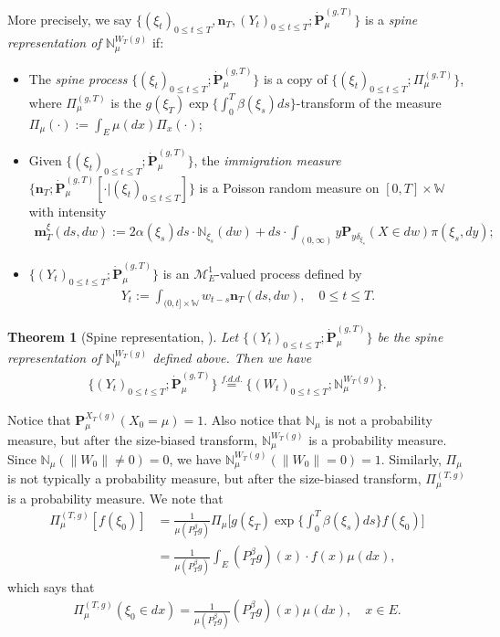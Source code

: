 \documentclass[12pt,a4paper]{amsart}
\newtheorem{thm}{Theorem}[section]
\theoremstyle{definition}
\numberwithin{equation}{section}
\begin{document}
More precisely,
we say $\{(\xi_t)_{0\leq t\leq T}, \mathbf n_T,  (Y_t)_{ 0\leq t\leq T}; \dot {\mathbf P}^{(g,T)}_\mu\}$ is a \emph{spine representation of $\mathbb N^{W_T(g)}_\mu$}  if:
\begin{itemize}
\item
	The \emph{spine process} $\{(\xi_t)_{0\leq t\leq T}; \dot{\mathbf P}^{(g,T)}_\mu\}$ is a copy of $\{(\xi_t)_{0\leq t\leq T}; \Pi^{(g,T)}_{\mu}\}$, where $\Pi^{(g,T)}_{\mu}$ is the $g(\xi_T) \exp\{\int_0^T \beta(\xi_s)ds\}$-transform of the measure $\Pi_{\mu}(\cdot):=\int_{E}\mu(dx)\Pi_x(\cdot) $;
\item
	Given $\{(\xi_t)_{0\leq t\leq T}; \dot{\mathbf P}^{(g,T)}_\mu\}$, the \emph{immigration measure} $\{\mathbf n_T; \dot{\mathbf P}^{(g,T)}_\mu[\cdot |(\xi_t)_{0\leq t\leq T}]\}$ is a Poisson random measure on $[0,T] \times \mathbb W$ with intensity
  \begin{align}
    \mathbf m^\xi_T(ds,dw)
    := 2 \alpha(\xi_s) ds \cdot \mathbb N_{\xi_s}(dw) + ds \cdot \int_{(0,\infty)} y \mathbf P_{y\delta_{\xi_s}}(X\in dw) \pi(\xi_s,dy);
  \end{align}
\item
	$\{(Y_t)_{0\leq t\leq T}; \dot{\mathbf P}^{(g,T)}_\mu\}$ is an $\mathcal M^1_E$-valued process defined by
  \begin{align}
    Y_t
    := \int_{(0,t] \times \mathbb W} w_{t-s} \mathbf n_T(ds,dw),
    \quad 0 \leq t\leq T.
  \end{align}
\end{itemize}
\begin{thm}[Spine representation, \cite{RenSongSun2017Spine}]\label{thm: spine representation}
	Let $\{(Y_t)_{0\leq t\leq T}; \dot {\mathbf P}^{(g,T)}_\mu\}$ be the spine representation of $\mathbb N^{W_T(g)}_\mu$ defined above.
	Then we have
  \begin{align}
    \{(Y_t)_{0\leq t\leq T}; \dot{\mathbf P}^{(g,T)}_\mu\}
    \overset{f.d.d.}{=} \{(W_t)_{0\leq t\leq T}; \mathbb N_\mu^{W_T(g)}\}.
  \end{align}
\end{thm}

Notice that $\mathbf P^{X_T(g)}_\mu(X_0 = \mu) = 1$.
Also notice that $\mathbb N_\mu$ is not a probability measure, but after the size-biased transform, $\mathbb N^{W_T(g)}_\mu$ is a probability measure.
Since $\mathbb N_{\mu}(\|W_0\|\neq 0) = 0$, we have $\mathbb N_\mu^{W_T(g)}(\|W_0\|= 0) = 1$.
Similarly, $\Pi_{\mu}$ is not typically a probability measure, but after the size-biased transform, $\Pi_{\mu}^{(T,g)}$ is a probability measure.
We note that
\begin{align}
	\Pi_{\mu}^{(T,g)} [ f(\xi_0) ]
	&= \frac{1}{\mu(P^\beta_Tg)}\Pi_{\mu}\Big[g(\xi_T)
   \exp\Big\{\int_0^T \beta(\xi_s)ds \Big\} f(\xi_0) \Big]
	\\&= \frac{1}{\mu(P^\beta_T g)}
	\int_E (P^\beta_T g)(x) \cdot f(x)\mu(dx),
\end{align}
which says that
\begin{align}\label{eq: initial distribution of spine}
	\Pi_{\mu}^{(T,g)} (\xi_0 \in dx)
	= \frac{1}{\mu(P^\beta_T g)} (P^\beta_T g)(x)\mu(dx),
	\quad x\in E.
\end{align}
\end{document}
